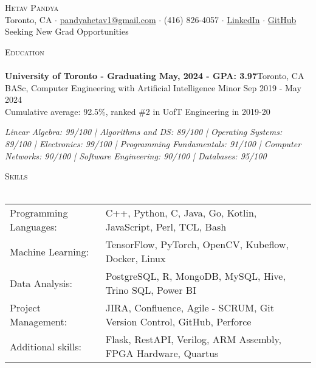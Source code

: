 \documentclass[a4paper]{article}
\newcommand{\lineunder} {
    \vspace*{-8pt} \\
    \hspace*{-18pt} \hrulefill \\
}
\newcommand{\header} [1] {
    {\hspace*{-18pt}\vspace*{6pt} \textsc{#1}}
    \vspace*{-6pt} \lineunder
}
\begin{document}
\vspace*{-40pt}



\vspace*{-10pt}
\begin{center}
	{\Huge \scshape {Hetav Pandya}}\\
	Toronto, CA $\cdot$ \href{mailto:pandyahetav1@gmail.com}{pandyahetav1@gmail.com} $\cdot$ (416) 826-4057 $\cdot$ \href{https://www.linkedin.com/in/hetav-pandya}{LinkedIn} $\cdot$ \href{https://github.com/pandyah5}{GitHub}\\
    Seeking New Grad Opportunities
\end{center}

\header{Education}
\textbf{University of Toronto - Graduating May, 2024 - GPA: 3.97}\hfill Toronto, CA\\
BASc, Computer Engineering with Artificial Intelligence Minor \hfill Sep 2019 - May 2024\\
Cumulative average: 92.5\%, ranked \#2 in UofT Engineering in 2019-20
\linebreak\\
\begin{footnotesize}
\textit{Linear Algebra: 99/100 | Algorithms and DS: 89/100 | Operating Systems: 89/100 | Electronics: 99/100 | 
 Programming Fundamentals: 91/100 | Computer Networks: 90/100 | Software Engineering: 90/100 | Databases: 95/100}
\end{footnotesize}
\vspace{2mm}

\header{Skills}
\begin{tabular}{ l l }
	Programming Languages: & C++, Python, C, Java, Go, Kotlin, JavaScript, Perl, TCL, Bash             \\
	Machine Learning:      & TensorFlow, PyTorch, OpenCV, Kubeflow, Docker, Linux             \\
	Data Analysis:         & PostgreSQL, R, MongoDB, MySQL, Hive, Trino SQL, Power BI            \\
	Project Management:    & JIRA, Confluence, Agile - SCRUM, Git Version Control, GitHub, Perforce           \\
    Additional skills:     & Flask, RestAPI, Verilog, ARM Assembly, FPGA Hardware, Quartus                      \\                               
\end{tabular}
\vspace{2mm}
\end{document}
